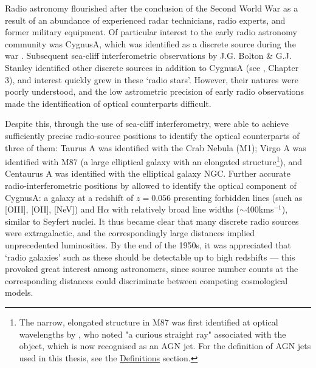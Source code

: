 Radio astronomy flourished after the conclusion of the Second World War as a result of an abundance of experienced radar technicians, radio experts, and former military equipment. Of particular interest to the early radio astronomy community was Cygnus\;A, which was identified as a discrete source during the war \citep{Hey1946}. Subsequent sea-cliff interferometric observations by J.G. Bolton \& G.J. Stanley identified other discrete sources in addition to Cygnus\;A (see \citealt{Kellerman2023}, Chapter 3), and interest quickly grew in these `radio stars'. However, their natures were poorly understood, and the low astrometric precision of early radio observations made the identification of optical counterparts difficult.

Despite this, through the use of sea-cliff interferometry, \citet{Bolton1949} were able to achieve sufficiently precise radio-source positions to identify the optical counterparts of three of them: Taurus A was identified with the Crab Nebula (M1); Virgo A was identified with M87 (a large elliptical galaxy with an elongated structure\footnote{The narrow, elongated structure in M87 was first identified at optical wavelengths by \citet{Curtis1918}, who noted "a curious straight ray" associated with the object, which is now recognised as an AGN jet. For the definition of AGN jets used in this thesis, see the \hyperref[chapter: definitions]{Definitions} section.}), and Centaurus A was identified with the elliptical galaxy NGC. Further accurate radio-interferometric positions by \citet{Smith1951} allowed \citet{Baade1954} to identify the optical component of Cygnus\;A: a galaxy at a redshift of $z=0.056$ presenting forbidden lines (such as [OIII], [OII], [NeV]) and H$\alpha$ with relatively broad line widths ($\sim$400\;km\;s$^{-1}$), similar to Seyfert nuclei. It thus became clear that many discrete radio sources were extragalactic, and the correspondingly large distances implied unprecedented luminosities. By the end of the 1950s, it was appreciated that `radio galaxies' such as these should be detectable up to high redshifts --- this provoked great interest among astronomers, since source number counts at the corresponding distances could discriminate between competing cosmological models.

